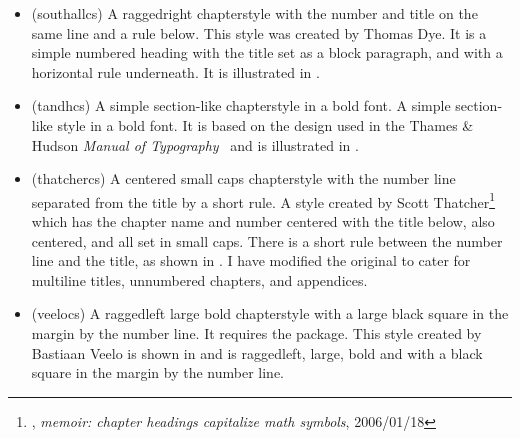\begin{itemize}


\item[\cstyle{southall}] 
\glossary(southallcs)%
  {}%
  { A raggedright chapterstyle with the number and title on the same line
   and a rule below.}
  This style was created by Thomas Dye. It
  is a simple numbered heading with the title set as a block 
  paragraph, and with a horizontal rule underneath. It is illustrated
  in .


\item[\cstyle{tandh}] 
\glossary(tandhcs)%
  {}%
  {A simple section-like chapterstyle in a bold font.}
A simple section-like style in a bold font. It is based on the design used in
the Thames \& Hudson \textit{Manual of Typography}~\cite{MCLEAN80} and 
is illustrated in 
.



\item[\cstyle{thatcher}] 
\glossary(thatchercs)%
  {}%
  {A centered small caps chapterstyle with the number line separated from 
   the title by a short rule.}
A style created by 
  Scott Thatcher\footnote{\ctt,
  \textit{memoir: chapter headings capitalize math symbols}, 2006/01/18} 
  which has the chapter name and number centered with the
  title below, also centered, and all set in small caps. There is a short rule
  between the number line and the title, as shown in . 
  I have modified the original to
  cater for multiline titles, unnumbered chapters, and appendices.




\item[\cstyle{veelo}]
\glossary(veelocs)%
  {}%
  {A raggedleft large bold chapterstyle with a large black square 
   in the margin by the number line. It requires the  package.}
   This style created by Bastiaan Veelo 
  is shown in  and is raggedleft, large, bold and with a
  black square in the margin by the number line. 


\end{itemize}
